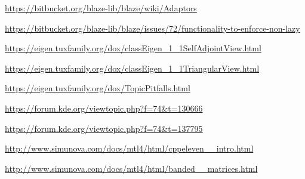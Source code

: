 \documentclass{article}
\begin{document}
\begin{thebibliography}{9}

\url{https://bitbucket.org/blaze-lib/blaze/wiki/Adaptors}

\url{https://bitbucket.org/blaze-lib/blaze/issues/72/functionality-to-enforce-non-lazy}

\url{https://eigen.tuxfamily.org/dox/classEigen_1_1SelfAdjointView.html}

\url{https://eigen.tuxfamily.org/dox/classEigen_1_1TriangularView.html}

\url{https://eigen.tuxfamily.org/dox/TopicPitfalls.html}

\url{https://forum.kde.org/viewtopic.php?f=74&t=130666}

\url{https://forum.kde.org/viewtopic.php?f=74&t=137795}

\url{http://www.simunova.com/docs/mtl4/html/cppeleven__intro.html}

\url{http://www.simunova.com/docs/mtl4/html/banded__matrices.html}

\end{thebibliography}
\end{document}
